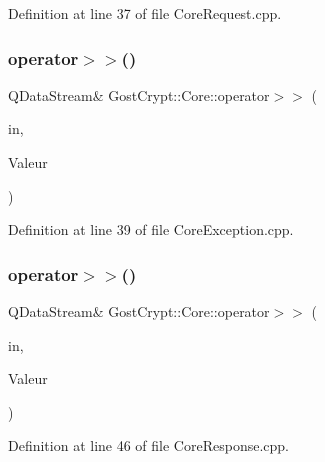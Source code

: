 Definition at line 37 of file Core\+Request.\+cpp.

\mbox{\label{namespace_gost_crypt_1_1_core_a1ff67feb7d22a2bbc87ac98667457856}} 
\subsubsection{\texorpdfstring{operator$>$$>$()}{operator>>()}\hspace{0.1cm}{\footnotesize\ttfamily [3/56]}}
{\footnotesize\ttfamily Q\+Data\+Stream\& Gost\+Crypt\+::\+Core\+::operator$>$$>$ (\begin{DoxyParamCaption}\item[{Q\+Data\+Stream \&}]{in,  }\item[{\hyperlink{class_gost_crypt_1_1_core_1_1_core_exception}{Gost\+Crypt\+::\+Core\+::\+Core\+Exception} \&}]{Valeur }\end{DoxyParamCaption})}



Definition at line 39 of file Core\+Exception.\+cpp.

\mbox{\label{namespace_gost_crypt_1_1_core_a55c580188398414943833a3325b55418}} 
\subsubsection{\texorpdfstring{operator$>$$>$()}{operator>>()}\hspace{0.1cm}{\footnotesize\ttfamily [4/56]}}
{\footnotesize\ttfamily Q\+Data\+Stream\& Gost\+Crypt\+::\+Core\+::operator$>$$>$ (\begin{DoxyParamCaption}\item[{Q\+Data\+Stream \&}]{in,  }\item[{\hyperlink{struct_gost_crypt_1_1_core_1_1_create_volume_response}{Create\+Volume\+Response} \&}]{Valeur }\end{DoxyParamCaption})}



Definition at line 46 of file Core\+Response.\+cpp.

